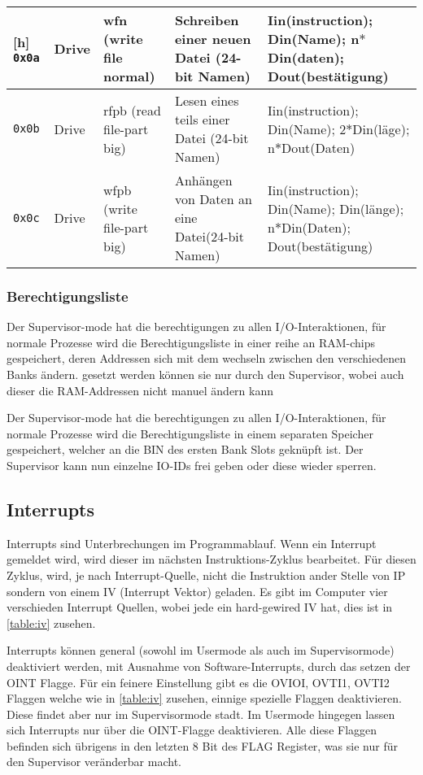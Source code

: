 \documentclass{scrartcl}
\begin{document}
\begin{center}
\begin{longtable}{p{} | p{} | p{} | p{} | p{}}[h]
			\hline
			\texttt{0x0a} & Drive & wfn (write file normal) & Schreiben einer neuen Datei (24-bit Namen) & Iin(instruction); Din(Name); n$*$Din(daten); Dout(bestätigung) \\
			\hline
			\texttt{0x0b} & Drive & rfpb (read file-part big) & Lesen eines teils einer Datei (24-bit Namen) & Iin(instruction); Din(Name); 2$*$Din(läge); n$*$Dout(Daten) \\
			\hline
			\texttt{0x0c} & Drive & wfpb (write file-part big) & Anhängen von Daten an eine Datei(24-bit Namen) & Iin(instruction); Din(Name); Din(länge); n$*$Din(Daten); Dout(bestätigung)
	\end{longtable}
\end{center}


\subsubsection{\label{section:persmissionIO}Berechtigungsliste}

Der Supervisor-mode hat die berechtigungen zu allen I/O-Interaktionen, für normale Prozesse wird die Berechtigungsliste in einer reihe an RAM-chips gespeichert, deren Addressen sich mit dem wechseln zwischen den verschiedenen Banks ändern.
gesetzt werden können sie nur durch den Supervisor, wobei auch dieser die RAM-Addressen nicht manuel ändern kann 

Der Supervisor-mode hat die berechtigungen zu allen I/O-Interaktionen, für normale Prozesse wird die Berechtigungsliste in einem separaten Speicher gespeichert, welcher an die BIN des ersten Bank Slots geknüpft ist. Der Supervisor kann nun einzelne IO-IDs frei geben oder diese wieder sperren.


\subsection{\label{section:interrupts}Interrupts}

Interrupts sind Unterbrechungen im Programmablauf. Wenn ein Interrupt gemeldet wird, wird dieser im nächsten Instruktions-Zyklus bearbeitet. Für diesen Zyklus, wird, je nach Interrupt-Quelle, nicht die Instruktion ander Stelle von IP sondern von einem IV (Interrupt Vektor) geladen. Es gibt im Computer vier verschieden Interrupt Quellen, wobei jede ein hard-gewired IV hat, dies ist in \autoref{table:iv} zusehen.

Interrupts können general (sowohl im Usermode als auch im Supervisormode) deaktiviert werden, mit Ausnahme von Software-Interrupts, durch das setzen der OINT Flagge. Für ein feinere Einstellung gibt es die OVIOI, OVTI1, OVTI2 Flaggen welche wie in \autoref{table:iv} zusehen, einnige spezielle Flaggen deaktivieren. Diese findet aber nur im Supervisormode stadt. Im Usermode hingegen lassen sich Interrupts nur über die OINT-Flagge deaktivieren. Alle diese Flaggen befinden sich übrigens in den letzten 8 Bit des FLAG Register, was sie nur für den Supervisor veränderbar macht.
\end{document}
